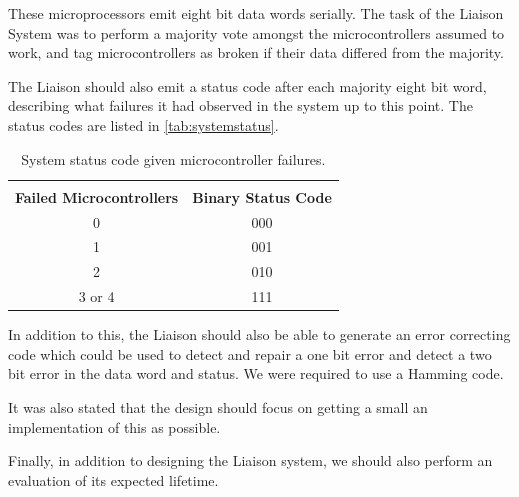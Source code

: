 These microprocessors emit eight bit data words serially. The task of
the Liaison System was to perform a majority vote amongst the
microcontrollers assumed to work, and tag microcontrollers as broken
if their data differed from the majority.

The Liaison should also emit a status code after each majority eight
bit word, describing what failures it had observed in the system up to
this point. The status codes are listed in \autoref{tab:systemstatus}.

\begin{table}[htbp]
  \centering
  \begin{tabular}{|c|c|}
    \hline \\
    \textbf{Failed Microcontrollers} & \textbf{Binary Status Code} \\ \hline
    0 & 000 \\ \hline
    1 & 001 \\ \hline
    2 & 010 \\ \hline
    3 or 4 & 111 \\ \hline
  \end{tabular}
  \caption{System status code given microcontroller failures.}
  \label{tab:systemstatus}
\end{table}

In addition to this, the Liaison should also be able to generate an
error correcting code which could be used to detect and repair a one
bit error and detect a two bit error in the data word and status. We
were required to use a Hamming code\cite{task}\cite{ecc}.

It was also stated that the design should focus on getting a small an
implementation of this as possible.

Finally, in addition to designing the Liaison system, we should also
perform an evaluation of its expected lifetime.
